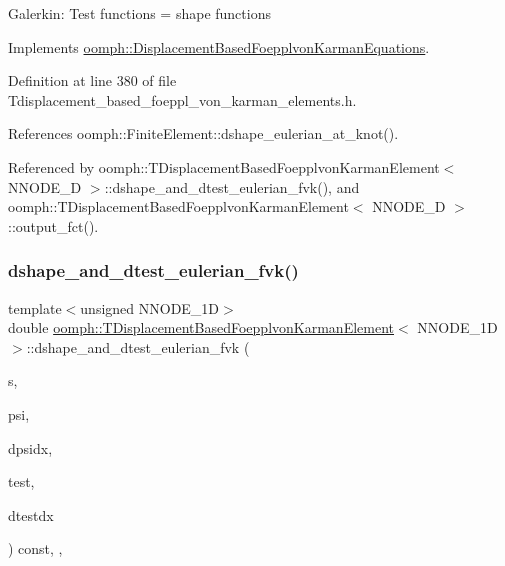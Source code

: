 Galerkin\+: Test functions = shape functions 

Implements \hyperlink{classoomph_1_1DisplacementBasedFoepplvonKarmanEquations_a93b089c7109311817e2fbd7dfcdca1f2}{oomph\+::\+Displacement\+Based\+Foepplvon\+Karman\+Equations}.



Definition at line 380 of file Tdisplacement\+\_\+based\+\_\+foeppl\+\_\+von\+\_\+karman\+\_\+elements.\+h.



References oomph\+::\+Finite\+Element\+::dshape\+\_\+eulerian\+\_\+at\+\_\+knot().



Referenced by oomph\+::\+T\+Displacement\+Based\+Foepplvon\+Karman\+Element$<$ N\+N\+O\+D\+E\+\_\+D $>$\+::dshape\+\_\+and\+\_\+dtest\+\_\+eulerian\+\_\+fvk(), and oomph\+::\+T\+Displacement\+Based\+Foepplvon\+Karman\+Element$<$ N\+N\+O\+D\+E\+\_\+D $>$\+::output\+\_\+fct().

\mbox{\label{classoomph_1_1TDisplacementBasedFoepplvonKarmanElement_a1df4d4f099c7a710a1c43004266e4ea7}} 
\subsubsection{\texorpdfstring{dshape\+\_\+and\+\_\+dtest\+\_\+eulerian\+\_\+fvk()}{dshape\_and\_dtest\_eulerian\_fvk()}}
{\footnotesize\ttfamily template$<$unsigned N\+N\+O\+D\+E\+\_\+1D$>$ \\
double \hyperlink{classoomph_1_1TDisplacementBasedFoepplvonKarmanElement}{oomph\+::\+T\+Displacement\+Based\+Foepplvon\+Karman\+Element}$<$ N\+N\+O\+D\+E\+\_\+1D $>$\+::dshape\+\_\+and\+\_\+dtest\+\_\+eulerian\+\_\+fvk (\begin{DoxyParamCaption}\item[{const \hyperlink{classoomph_1_1Vector}{Vector}$<$ double $>$ \&}]{s,  }\item[{\hyperlink{classoomph_1_1Shape}{Shape} \&}]{psi,  }\item[{\hyperlink{classoomph_1_1DShape}{D\+Shape} \&}]{dpsidx,  }\item[{\hyperlink{classoomph_1_1Shape}{Shape} \&}]{test,  }\item[{\hyperlink{classoomph_1_1DShape}{D\+Shape} \&}]{dtestdx }\end{DoxyParamCaption}) const\hspace{0.3cm}{\ttfamily [inline]}, {\ttfamily [protected]}, {\ttfamily [virtual]}}



